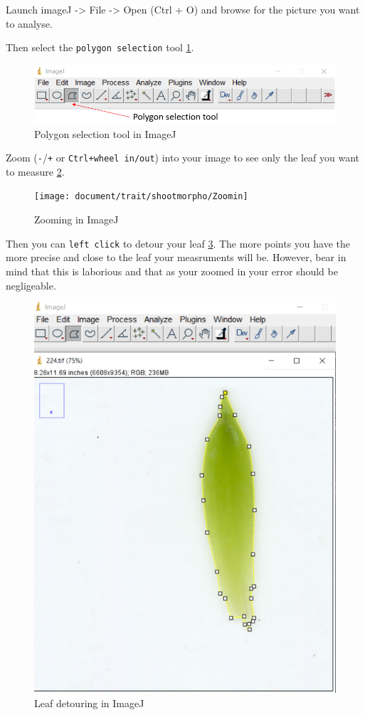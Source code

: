\documentclass[
  12pt,
  american,
  a4paper,
  extrafontsizes,onecolumn,openright
  ]{memoir}
\begin{document}
Launch imageJ -\textgreater{} File -\textgreater{} Open (Ctrl + O) and browse for the picture you want to analyse.

Then select the \texttt{polygon\ selection} tool \ref{fig:polygon}.

\scriptsize

\begin{figure}

{\centering \includegraphics[width=0.5\linewidth]{document/trait/shootmorpho/polygon_selection_imageJ} 

}

\caption{Polygon selection tool in ImageJ}\label{fig:polygon}
\end{figure}

\normalsize

Zoom (\texttt{-}/\texttt{+} or \texttt{Ctrl+wheel\ in/out}) into your image to see only the leaf you want to measure \ref{fig:zoomin}.

\scriptsize

\begin{figure}

{\centering \texttt{[image: document/trait/shootmorpho/Zoomin]} 

}

\caption{Zooming in ImageJ}\label{fig:zoomin}
\end{figure}

\normalsize

Then you can \texttt{left\ click} to detour your leaf \ref{fig:detouring}.
The more points you have the more precise and close to the leaf your measruments will be.
However, bear in mind that this is laborious and that as your zoomed in your error should be negligeable.

\scriptsize

\begin{figure}

{\centering \includegraphics[width=0.5\linewidth]{document/trait/shootmorpho/detouring_leaf} 

}

\caption{Leaf detouring in ImageJ}\label{fig:detouring}
\end{figure}
\end{document}

